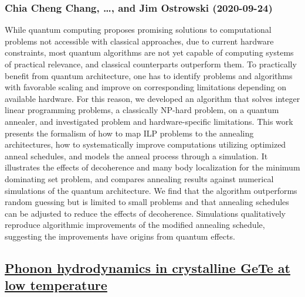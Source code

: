 \subsubsection*{Chia Cheng Chang, \dots, and Jim Ostrowski (2020-09-24)}
While quantum computing proposes promising solutions to computational
problems not accessible with classical approaches, due to current hardware
constraints, most quantum algorithms are not yet capable of computing systems
of practical relevance, and classical counterparts outperform them. To
practically benefit from quantum architecture, one has to identify problems and
algorithms with favorable scaling and improve on corresponding limitations
depending on available hardware. For this reason, we developed an algorithm
that solves integer linear programming problems, a classically NP-hard problem,
on a quantum annealer, and investigated problem and hardware-specific
limitations. This work presents the formalism of how to map ILP problems to the
annealing architectures, how to systematically improve computations utilizing
optimized anneal schedules, and models the anneal process through a simulation.
It illustrates the effects of decoherence and many body localization for the
minimum dominating set problem, and compares annealing results against
numerical simulations of the quantum architecture. We find that the algorithm
outperforms random guessing but is limited to small problems and that annealing
schedules can be adjusted to reduce the effects of decoherence. Simulations
qualitatively reproduce algorithmic improvements of the modified annealing
schedule, suggesting the improvements have origins from quantum effects.

\subsection*{\href{http://arxiv.org/abs/2009.11962v1}{Phonon hydrodynamics in crystalline GeTe at low temperature}}
